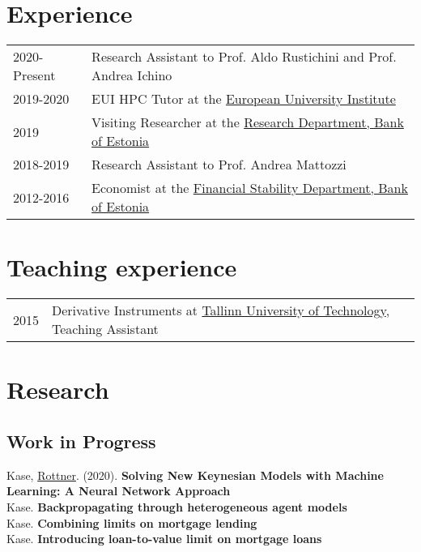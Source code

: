 \documentclass[a4, 11pt]{article}
\begin{document}
    \section*{Experience}
  \begin{table}[H]
      \begin{tabular}{p{2.5cm}p{13.5cm}}
          2020-Present & Research Assistant  {to Prof. Aldo Rustichini and Prof. Andrea Ichino} \\
          2019-2020 & EUI HPC Tutor at the  \href{https://www.eui.eu/ServicesAndAdmin/ComputingService/HeavyComputationalTasks}{European University Institute} \\
          2019 & Visiting Researcher at the  \href{https://www.eestipank.ee/en}{Research Department, Bank of Estonia} \\
          2018-2019 & Research Assistant  {to Prof. Andrea Mattozzi} \\
          2012-2016 & Economist at the  \href{https://www.eestipank.ee/en}{Financial Stability Department, Bank of Estonia} \\
      \end{tabular}
    \end{table}


    \section*{Teaching experience}
  \begin{table}[H]
      \begin{tabular}{p{2cm}p{14cm}}
          2015 & {Derivative Instruments} at \href{https://www.ttu.ee/en}{Tallinn University of Technology}, Teaching Assistant\\
      \end{tabular}
    \end{table}


    \section*{Research}\subsection*{Work in Progress}
      Kase, \href{https://sites.google.com/view/matthias-rottner/home}{Rottner}. (2020). \textbf{Solving New Keynesian Models with Machine Learning: A Neural Network Approach}\\
      Kase. \textbf{Backpropagating through heterogeneous agent models}\\
      Kase. \textbf{Combining limits on mortgage lending}\\
      Kase. \textbf{Introducing loan-to-value limit on mortgage loans}\\
\end{document}

